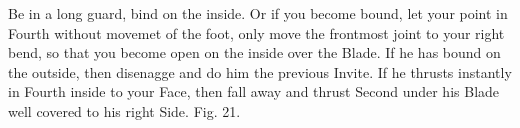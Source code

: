 \exercise{}
Be in a long guard, bind on the inside. Or if you become bound, let
your point in Fourth without movemet of the foot, only move the
frontmost joint to your right bend, so that you become open on the
inside over the Blade. If he has bound on the outside, then disenagge
and do him the previous Invite. If he thrusts instantly in Fourth
inside to your Face, then fall away and thrust Second under his Blade
well covered to his right Side. Fig. 21.
